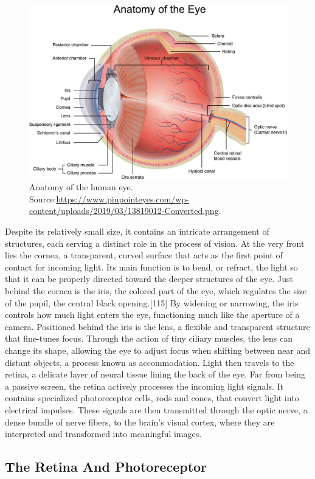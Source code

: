 \documentclass[12pt]{report}
\begin{document}
\begin{figure}[ht]
    \centering
    \includegraphics[width = 0.6
    \textwidth]{Images/Theory/occhio.jpg}
    \caption{Anatomy of the human eye. Source:\url{https://www.pinpointeyes.com/wp-content/uploads/2019/03/13819012-Converted.png}.}
    \label{fig:ana}
\end{figure}

Despite its relatively small size, it contains an intricate arrangement of structures, each serving a distinct role in the process of vision.
At the very front lies the cornea, a transparent, curved surface that acts as the first point of contact for incoming light. 
Its main function is to bend, or refract, the light so that it can be properly directed toward the deeper structures of the eye.
Just behind the cornea is the iris, the colored part of the eye, which regulates the size of the pupil, the central black opening.[115] 
By widening or narrowing, the iris controls how much light enters the eye, functioning much like the aperture of a camera.
Positioned behind the iris is the lens, a flexible and transparent structure that fine-tunes focus. 
Through the action of tiny ciliary muscles, the lens can change its shape, allowing the eye to adjust focus when shifting between near and distant objects, a process known as accommodation.
Light then travels to the retina, a delicate layer of neural tissue lining the back of the eye. 
Far from being a passive screen, the retina actively processes the incoming light signals. 
It contains specialized photoreceptor cells, rods and cones, that convert light into electrical impulses. 
These signals are then transmitted through the optic nerve, a dense bundle of nerve fibers, to the brain's visual cortex, where they are interpreted and transformed into meaningful images.

\subsection{The Retina And Photoreceptor}
\end{document}
